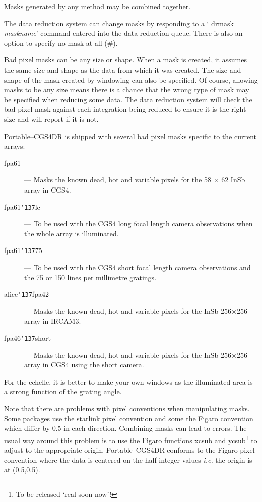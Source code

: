 \documentclass[a4paper]{book}
\renewcommand{\_}{{\tt\char'137}}
\begin{document}
Masks generated by any method may be combined together.

The data reduction system can change masks by responding to a `{\sc
drmask} {\em maskname}' command entered into the data reduction queue.
There is also an option to specify no mask at all (\#).

Bad pixel masks can be any size or shape. When a mask is created, it
assumes the same size and shape as the data from which it was created. The
size and shape of the mask created by windowing can also be specified. Of
course, allowing masks to be any size means there is a chance that the
wrong type of mask may be specified when reducing some data. The data
reduction system will check the bad pixel mask against each integration
being reduced to ensure it is the right size and will report if it is not.

Portable--CGS4DR is shipped with several bad pixel masks specific to the
current arrays:

\begin{description}
\item[{\sf fpa61}] --- Masks the known dead, hot and variable pixels for the
58 $\times$ 62 InSb array in CGS4.
\item[{\sf fpa61\_lc}] --- To be used with the CGS4 long focal length camera
 observations when the whole array is illuminated.
\item[{\sf fpa61\_75}] --- To be used with the CGS4 short focal length camera
 observations and the 75 or 150 lines per millimetre gratings.
\item[{\sf alice\_fpa42}] --- Masks the known dead, hot and variable pixels
for the InSb 256$\times$256 array in IRCAM3.
\item[{\sf fpa46\_short}] --- Masks the known dead, hot and variable pixels
for the InSb 256$\times$256 array in CGS4 using the short camera.
\end{description}

For the echelle, it is better to make your own windows as the illuminated area
is a strong function of the grating angle.

Note that there are problems with pixel conventions when manipulating
masks. Some packages use the {\sc starlink} pixel convention and some the Figaro
convention which differ by 0.5 in each direction. Combining masks can lead
to errors. The usual way around this problem is to use the Figaro
functions {\sc xcsub} and {\sc ycsub}\footnote[2]{To be released `real
soon now'!} to adjust to the appropriate origin. Portable--CGS4DR conforms
to the Figaro pixel convention where the data is centered on the
half-integer values {\em i.e.} the origin is at (0.5,0.5).
\end{document}
